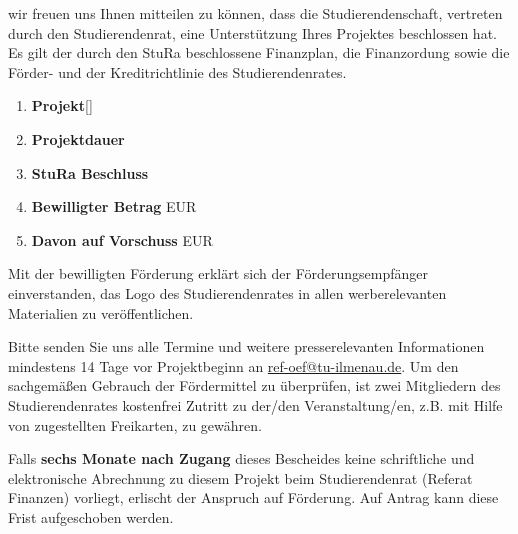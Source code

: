 wir freuen uns Ihnen mitteilen zu können, dass die Studierendenschaft, vertreten durch den Studierendenrat, eine Unterstützung Ihres Projektes beschlossen hat.
Es gilt der durch den StuRa beschlossene Finanzplan, die Finanzordung sowie die Förder- und der Kreditrichtlinie des Studierendenrates.

\begin{enumerate}[label=\Roman*]
\item \textbf{Projekt}\hfill [] 
\item \textbf{Projektdauer} \hfill {} 
\item \textbf{StuRa Beschluss} \hfill {}
\item \textbf{Bewilligter Betrag} \hfill {} EUR
\item \textbf{Davon auf Vorschuss} \hfill {} EUR
\end{enumerate}
Mit der bewilligten Förderung erklärt sich der Förderungsempfänger einverstanden, das Logo des Studierendenrates in allen werberelevanten Materialien zu veröffentlichen.

Bitte senden Sie uns alle Termine und weitere presserelevanten Informationen mindestens 14 Tage vor Projektbeginn an \href{mailto:ref-oeff@tu-ilmenau.de}{ref-oef@tu-ilmenau.de}.
Um den sachgemäßen Gebrauch der Fördermittel zu überprüfen, ist zwei Mitgliedern des Studierendenrates kostenfrei Zutritt zu der/den Veranstaltung/en, z.B. mit Hilfe von zugestellten Freikarten, zu gewähren.

Falls \textbf{sechs Monate nach Zugang} dieses Bescheides keine schriftliche und elektronische Abrechnung zu diesem Projekt beim Studierendenrat (Referat Finanzen) vorliegt, erlischt der Anspruch auf Förderung. Auf Antrag kann diese Frist aufgeschoben werden.

